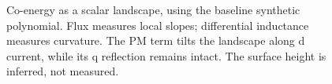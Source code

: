 \begin{figure}[tb]
\centering
{}
\caption{Co-energy as a scalar landscape, using the baseline synthetic
polynomial. Flux measures local slopes; differential inductance measures
curvature. The PM term tilts the landscape along d current, while its q
reflection remains intact. The surface height is inferred, not measured.}
\label{fig:landscape}
\end{figure}
